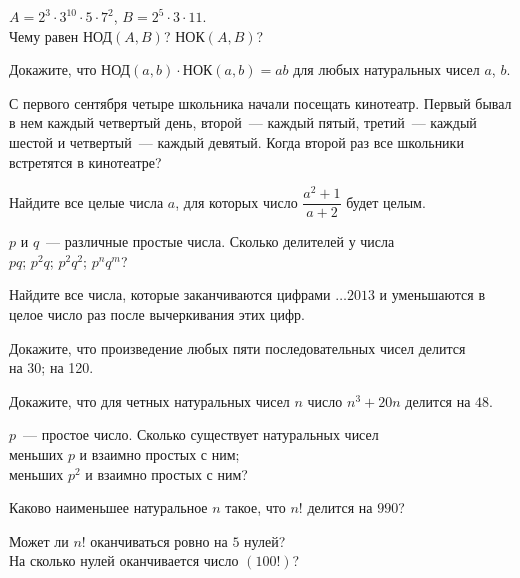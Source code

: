 \begin{problems}

\item
$A = 2^3 \cdot 3^{10} \cdot 5 \cdot 7^2$,
$B = 2^5 \cdot 3 \cdot 11$.
\\
Чему равен
\quad
\sbp $\text{НОД}(A, B)$?
\quad
\sbp $\text{НОК}(A, B)$?

\item
Докажите, что
\(
    \text{НОД}(a, b) \cdot \text{НОК}(a, b) = a b
\)
для любых натуральных чисел $a$, $b$.

\item
С первого сентября четыре школьника начали посещать кинотеатр.
Первый бывал в нем каждый четвертый день, второй~--- каждый пятый, третий~---
каждый шестой и четвертый~--- каждый девятый.
Когда второй раз все школьники встретятся в кинотеатре?

\item
Найдите все целые числа $a$, для которых число $\dfrac{a^2 + 1}{a + 2}$ будет
целым.

\item
$p$ и $q$~--- различные простые числа.
Сколько делителей у числа
\\
\sbp $p q$;
\quad
\sbp $p^2 q$;
\quad
\sbp $p^2 q^2$;
\quad
\sbp $p^n q^m$?

\item
Найдите все числа, которые заканчиваются цифрами $\ldots 2013$ и уменьшаются в
целое число раз после вычеркивания этих цифр.

\item
Докажите, что произведение любых пяти последовательных чисел делится
\\
\sbp на 30;
\quad
\sbp на 120.

\item
Докажите, что для четных натуральных чисел $n$ число $n^3 + 20 n$ делится на
$48$.

\item
$p$~--- простое число.
Сколько существует натуральных чисел
\\
\sbp меньших $p$ и взаимно простых с ним;
\\
\sbp меньших $p^2$ и взаимно простых с ним?

\item
Каково наименьшее натуральное $n$ такое, что $n!$ делится на $990$?

\item
\sbp
Может ли $n!$ оканчиваться ровно на $5$ нулей?
\\
\sbp
На сколько нулей оканчивается число $(100!)$?


\end{problems}
